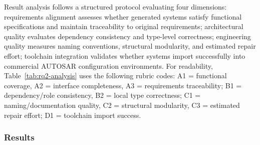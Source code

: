 \documentclass[acmlarge,nonacm]{acmart}
\theoremstyle{acmplain}
\theoremstyle{acmdefinition}
\begin{document}
Result analysis follows a structured protocol evaluating four dimensions: requirements alignment assesses whether generated systems satisfy functional specifications and maintain traceability to original requirements; architectural quality evaluates dependency consistency and type-level correctness; engineering quality measures naming conventions, structural modularity, and estimated repair effort; toolchain integration validates whether systems import successfully into commercial AUTOSAR configuration environments. For readability, Table~\ref{tab:rq2-analysis} uses the following rubric codes: A1 = functional coverage, A2 = interface completeness, A3 = requirements traceability; B1 = dependency/role consistency, B2 = local type correctness; C1 = naming/documentation quality, C2 = structural modularity, C3 = estimated repair effort; D1 = toolchain import success.

\subsubsection{Results}
\label{sec:rq2-results}
\end{document}
